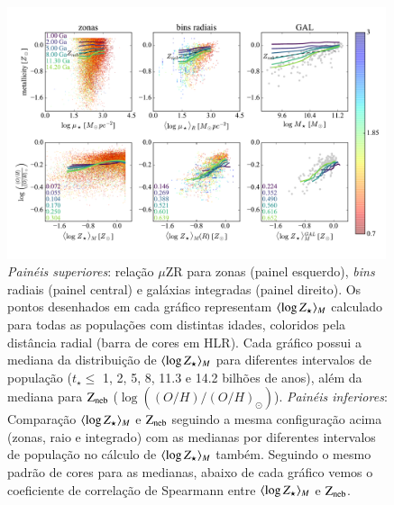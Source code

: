 \begin{figure}
	\centering
	\includegraphics[width=0.99\textwidth]{figuras/stellar_muZR_realsample.pdf}
	\caption[Relação $\mu$ZR e comparação entre as metalicidades.]
	{\emph{Painéis superiores}: relação $\mu$ZR para zonas (painel esquerdo), {\em bins} radiais
(painel central) e galáxias integradas (painel direito). Os pontos desenhados em cada gráfico
representam $\meanM{\log Z_\star}$ calculado para todas as populações com distintas idades,
coloridos pela distância radial (barra de cores em HLR). Cada gráfico possui a mediana da
distribuição de $\meanM{\log Z_\star}$ para diferentes intervalos de população ($t_\star \leq$ 1,
2, 5, 8, 11.3 e 14.2 bilhões de anos), além da mediana para $\mathrm{Z}_{\mathrm{neb}}$
($\log\left((O/H)/(O/H)_\odot\right)$). \emph{Painéis inferiores}: Comparação $\meanM{\log Z_\star}$
e $\mathrm{Z}_{\mathrm{neb}}$ seguindo a mesma configuração acima (zonas, raio e integrado) com as medianas por diferentes
intervalos de população no cálculo de $\meanM{\log Z_\star}$ também. Seguindo o mesmo padrão de
cores para as medianas, abaixo de cada gráfico vemos o coeficiente de correlação de Spearmann entre
$\meanM{\log Z_\star}$ e $\mathrm{Z}_{\mathrm{neb}}$.}
	\label{fig:ZstarvsZneb}
\end{figure}

